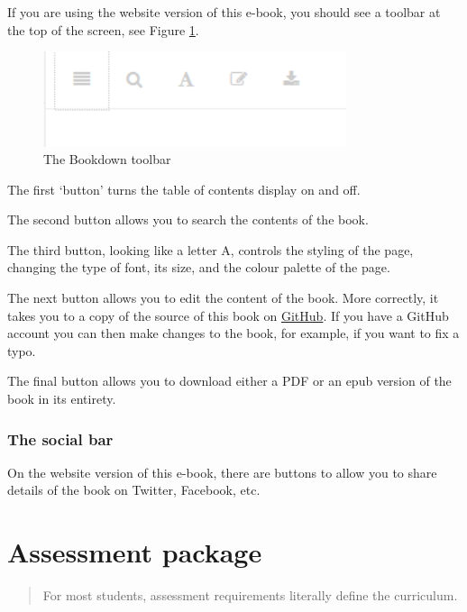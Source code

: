 \documentclass[]{book}
\theoremstyle{definition}
\theoremstyle{definition}
\theoremstyle{definition}
\theoremstyle{remark}
\begin{document}
If you are using the website version of this e-book, you should see a
toolbar at the top of the screen, see Figure \ref{fig:toolbar}.

\begin{figure}
\includegraphics[width=3.5in]{images/toolbar} \caption{The Bookdown toolbar}\label{fig:toolbar}
\end{figure}

The first `button' turns the table of contents display on and off.

The second button allows you to search the contents of the book.

The third button, looking like a letter A, controls the styling of the
page, changing the type of font, its size, and the colour palette of the
page.

The next button allows you to edit the content of the book. More
correctly, it takes you to a copy of the source of this book on
\href{https://www.github.com}{GitHub}. If you have a GitHub account you
can then make changes to the book, for example, if you want to fix a
typo.

The final button allows you to download either a PDF or an epub version
of the book in its entirety.

\hypertarget{the-social-bar}{%
\subsection*{The social bar}\label{the-social-bar}}

On the website version of this e-book, there are buttons to allow you to
share details of the book on Twitter, Facebook, etc.

\hypertarget{assessments}{%
\chapter{Assessment package}\label{assessments}}

\begin{quote}
For most students, assessment requirements literally define the
curriculum. \autocite[ p.~7]{james_2002_assessinglearningaustralian}
\end{quote}
\end{document}
